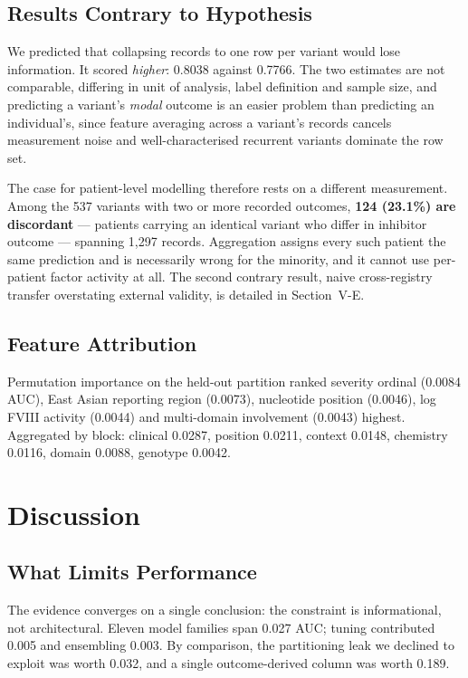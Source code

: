 \documentclass[conference]{IEEEtran}
\begin{document}
\subsection{Results Contrary to Hypothesis}
We predicted that collapsing records to one row per variant would lose
information. It scored \textit{higher}: 0.8038 against 0.7766. The two
estimates are not comparable, differing in unit of analysis, label definition
and sample size, and predicting a variant's \textit{modal} outcome is an easier
problem than predicting an individual's, since feature averaging across a
variant's records cancels measurement noise and well-characterised recurrent
variants dominate the row set.

The case for patient-level modelling therefore rests on a different
measurement. Among the 537 variants with two or more recorded outcomes,
\textbf{124 (23.1\%) are discordant} --- patients carrying an identical variant
who differ in inhibitor outcome --- spanning 1{,}297 records. Aggregation
assigns every such patient the same prediction and is necessarily wrong for the
minority, and it cannot use per-patient factor activity at all. The second
contrary result, naive cross-registry transfer overstating external validity,
is detailed in Section~V-E.

\subsection{Feature Attribution}
Permutation importance on the held-out partition ranked severity ordinal
(0.0084 AUC), East Asian reporting region (0.0073), nucleotide position
(0.0046), log FVIII activity (0.0044) and multi-domain involvement (0.0043)
highest. Aggregated by block: clinical 0.0287, position 0.0211, context 0.0148,
chemistry 0.0116, domain 0.0088, genotype 0.0042.

\section{Discussion}

\subsection{What Limits Performance}
The evidence converges on a single conclusion: the constraint is
informational, not architectural. Eleven model families span 0.027 AUC; tuning
contributed 0.005 and ensembling 0.003. By comparison, the partitioning leak we
declined to exploit was worth 0.032, and a single outcome-derived column was
worth 0.189.
\end{document}
